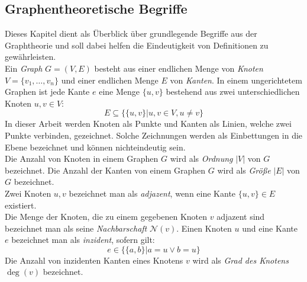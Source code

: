 \subsection{Graphentheoretische Begriffe}
\label{chap_prel}
Dieses Kapitel dient als Überblick über grundlegende Begriffe aus der Graphtheorie und soll dabei helfen die Eindeutigkeit von Definitionen zu gewährleisten.\\
Ein \emph{Graph} $G = (V, E)$ besteht aus einer endlichen Menge von \emph{Knoten} $V = \{v_1 ,\ldots, v_n\}$ und einer endlichen Menge $E$ von \emph{Kanten}. In einem ungerichtetem Graphen ist jede Kante $e$ eine Menge $\{u, v\}$ bestehend aus zwei unterschiedlichen Knoten $u, v \in V$:
$$E \subseteq \{\{u, v\} | u, v \in V, u \neq v\}$$
In dieser Arbeit werden Knoten als Punkte und Kanten als Linien, welche zwei Punkte verbinden, gezeichnet. Solche Zeichnungen werden als Einbettungen in die Ebene bezeichnet und können nichteindeutig sein.\\ Die Anzahl von Knoten in einem Graphen $G$ wird als \emph{Ordnung} $|V|$ von $G$ bezeichnet. Die Anzahl der Kanten von einem Graphen $G$ wird als \emph{Größe} $|E|$ von $G$ bezeichnet.\\Zwei Knoten $u,v$ bezeichnet man als \emph{adjazent}, wenn eine Kante $\{u, v\} \in E$ existiert.\\Die Menge der Knoten, die zu einem gegebenen Knoten $v$ adjazent sind bezeichnet man als seine \emph{Nachbarschaft} $\mathcal{N}(v)$. Einen Knoten $u$ und eine Kante $e$ bezeichnet man als \emph{inzident}, sofern gilt: $$e \in \{\{a,b\}|a=u \vee b=u\}$$ Die Anzahl von inzidenten Kanten eines Knotens $v$ wird als \emph{Grad des Knotens} $\deg(v)$ bezeichnet.
